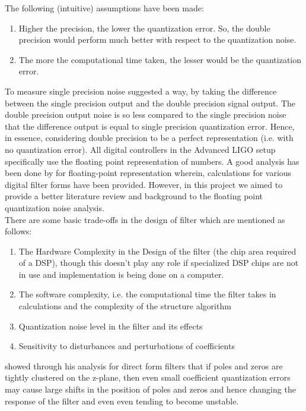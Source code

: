 \documentclass[colorlinks=true,pdfstartview=FitV,linkcolor=blue,
            citecolor=red,urlcolor=magenta]{ligodoc}
\begin{document}
The following (intuitive) assumptions have been made:
\begin{enumerate}
\item Higher the precision, the lower the quantization error. So, the double precision would perform much better with respect to the quantization noise.
\item The more the computational time taken, the lesser would be the quantization error.
\end{enumerate}
To measure single precision noise \cite{Den} suggested a way, by taking the difference between the single precision output and the double precision signal output. The double precision output noise is so less compared to the single precision noise that the difference output is equal to single precision quantization error. Hence, in essence, considering double precision to be a perfect representation (i.e. with no quantization error).
All digital controllers in the Advanced LIGO setup specifically use the floating point representation of numbers. A good analysis has been done by \cite{Matts} for floating-point representation wherein, calculations for various digital filter forms have been provided. However, in this project we aimed to provide a better literature review and background to the floating point quantization noise analysis. \\

There are some basic trade-offs in the design of filter which are mentioned as follows: \\
\begin{enumerate}
\item The Hardware Complexity in the Design of the filter (the chip area required of a DSP), though this doesn't play any role if specialized DSP chips are not in use and implementation is being done on a computer. \\
\item The software complexity, i.e. the computational time the filter takes in calculations and the complexity of the structure algorithm \\
\item Quantization noise level in the filter and its effects \\
\item Sensitivity to disturbances and perturbations of coefficients \\
\end{enumerate}

\cite{Kaiser} showed through his analysis for direct form filters that if poles and zeros are tightly clustered on the z-plane, then even small coefficient quantization errors may cause large shifts in the position of poles and zeros and hence changing the response of the filter and even even tending to become unstable.  \\
\end{document}
